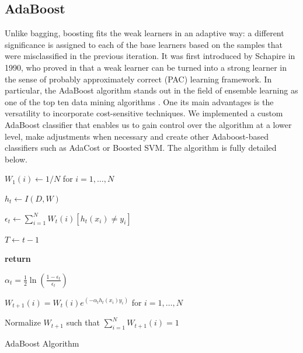 \documentclass[conference]{IEEEtran}
\begin{document}
\subsection{AdaBoost}
Unlike bagging, boosting fits the weak learners in an adaptive way: a different significance is assigned to each of the base learners based on the samples that were misclassified in the previous iteration. It was first introduced by Schapire in 1990, who proved in \cite{schapire} that a weak learner can be turned into a strong learner in the sense of probably approximately correct (PAC) learning framework. In particular, the AdaBoost algorithm stands out in the field of ensemble learning as one of the top ten data mining algorithms \cite{top10algo}. One its main advantages is the versatility to incorporate cost-sensitive techniques. We implemented a custom AdaBoost classifier that enables us to gain control over the algorithm at a lower level, make adjustments when necessary and create other Adaboost-based classifiers such as AdaCost or Boosted SVM. The algorithm is fully detailed below.

\begin{algorithm}
  $W_1(i) \leftarrow 1/N$ for $i=1,\dots,N$ %
  
    {
        $h_t \leftarrow I(D,W)$
        
        $\epsilon_t \leftarrow \sum^N_{i=1}W_t(i)[h_t(x_i)\neq y_i]$
        
        		{
		
		$T \leftarrow t-1$
		
		\bf{return}
		}
		
	$\alpha_t = \frac{1}{2}\ln \left( \frac{1-\epsilon_t}{\epsilon_t} \right)$
	
	  
	 $W_{t+1}(i) = W_t(i) e^{(-\alpha_th_t(x_i)y_i)}$ for $i=1,\dots,N$
	 
	 Normalize $W_{t+1}$ such that $\sum^N_{i=1}W_{t+1}(i)=1$
	  
    }
\caption{AdaBoost Algorithm}
\end{algorithm}
\end{document}
